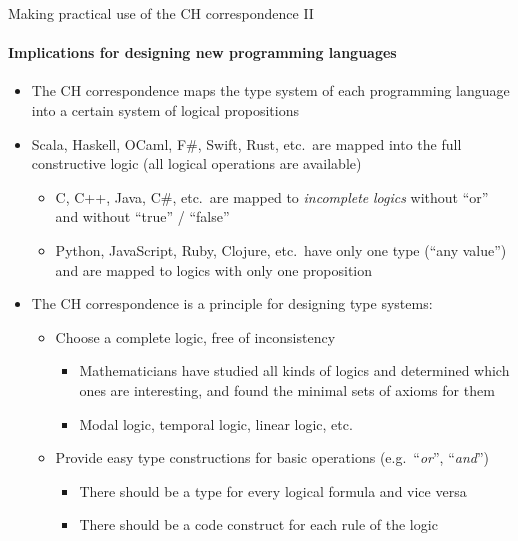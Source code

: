 \documentclass[english]{beamer}
\begin{document}
\begin{frame}{Making practical use of the CH correspondence II}


\framesubtitle{Implications for designing new programming languages}
\begin{itemize}
\item The CH correspondence maps the type system of each programming language
into a certain system of logical propositions 
\item Scala, Haskell, OCaml, F\#, Swift, Rust, etc.~are mapped into the
full constructive logic (all logical operations are available)
\begin{itemize}
\item C, C++, Java, C\#, etc.~are mapped to \emph{incomplete} \emph{logics}
\textendash{} without ``or'' and without ``true'' / ``false''
\item Python, JavaScript, Ruby, Clojure, etc.~have only one type (``any
value'') and are mapped to logics with only one proposition
\end{itemize}
\item The CH correspondence is a principle for designing type systems:
\begin{itemize}
\item Choose a complete logic, free of inconsistency
\begin{itemize}
\item Mathematicians have studied all kinds of logics and determined which
ones are interesting, and found the minimal sets of axioms for them
\item Modal logic, temporal logic, linear logic, etc.
\end{itemize}
\item Provide easy type constructions for basic operations (e.g.~``\emph{or}'',
``\emph{and}'')
\begin{itemize}
\item There should be a type for every logical formula and vice versa
\item There should be a code construct for each rule of the logic
\end{itemize}
\end{itemize}
\end{itemize}
\end{frame}
\end{document}

